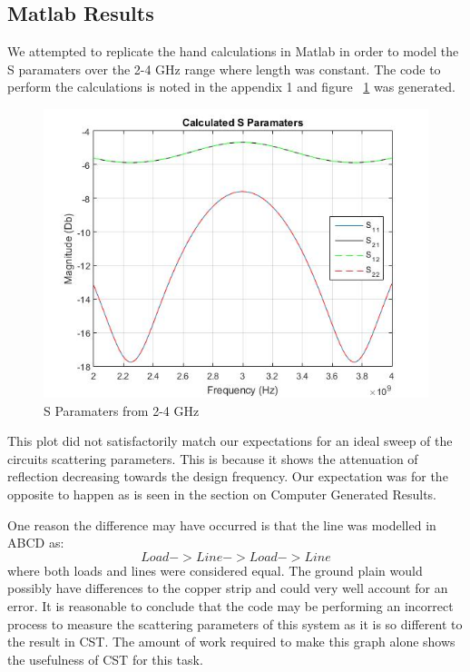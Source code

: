 \documentclass{paper}
\begin{document}
\subsection{Matlab Results}
We attempted to replicate the hand calculations in Matlab in order to model the S paramaters over the 2-4 GHz range where length was constant. The code to perform the calculations is noted in the appendix 1 and figure ~\ref{fig:matlab_S} was generated.

\begin{figure}[H]
	\centering
	\includegraphics[scale=0.5]{IMG/ideal_sweep}
	\caption{S Paramaters from 2-4 GHz}
	\label{fig:matlab_S}
\end{figure}

This plot did not satisfactorily match our expectations for an ideal sweep of the circuits scattering parameters. This is because it shows the attenuation of reflection decreasing towards the design frequency. Our expectation was for the opposite to happen as is seen in the section on Computer Generated Results.

One reason the difference may have occurred is that the line was modelled in ABCD as:
$$Load->Line->Load->Line$$
where both loads and lines were considered equal. The ground plain would possibly have differences to the copper strip and could very well account for an error. It is reasonable to conclude that the code may be performing an incorrect process to measure the scattering parameters of this system as it is so different to the result in CST. The amount of work required to make this graph alone shows the usefulness of CST for this task.
\end{document}
